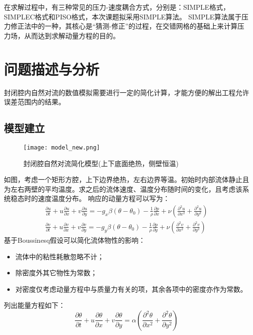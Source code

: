 \documentclass[UTF8]{article} %
\begin{document}
在求解过程中，有三种常见的压力-速度耦合方式，分别是：SIMPLE格式，SIMPLEC格式和PISO格式，本次课题拟采用SIMPLE算法。
SIMPLE算法属于压力修正法中的一种，其核心是“猜测-修正”的过程，在交错网格的基础上来计算压力场，从而达到求解动量方程的目的。

\section{问题描述与分析}
封闭腔内自然对流的数值模拟需要进行一定的简化计算，才能方便的解出工程允许误差范围内的结果。

\subsection{模型建立}
\begin{figure}[h]
  \centering
  \texttt{[image: model\_new.png]}
  \caption{封闭腔自然对流简化模型(上下底面绝热，侧壁恒温)}
  \label{fig:model}
\end{figure}
如图，考虑一个矩形方腔，上下边界绝热，左右边界等温。初始时内部流体静止且为左右两壁的平均温度。求之后的流体速度、温度分布随时间的变化，且考虑该系统稳态时的速度温度分布。
响应的动量方程可以写为：
\begin{gather}
  \frac{\partial u}{\partial t} + u \frac{\partial u}{\partial x} + v \frac{\partial u}{\partial y} = -g_x \beta (\theta-\theta_0) - \frac{1}{\rho} \frac{\partial p}{\partial x}+\nu(\frac{\partial^2 u}{\partial x^2}+\frac{\partial^2 u}{\partial y^2}) \\
  \frac{\partial v}{\partial t} + u \frac{\partial v}{\partial x} + v \frac{\partial v}{\partial y} = -g_y \beta (\theta-\theta_0) - \frac{1}{\rho} \frac{\partial p}{\partial y}+\nu(\frac{\partial^2 v}{\partial x^2}+\frac{\partial^2 v}{\partial y^2})
\end{gather}
基于Boussinesq假设可以简化流体物性的影响：
\begin{itemize}
  \item 流体中的粘性耗散忽略不计；
  \item 除密度外其它物性为常数；
  \item 对密度仅考虑动量方程中与质量力有关的项，其余各项中的密度亦作为常数。
\end{itemize}
列出能量方程如下：
\begin{equation}
  \frac{\partial \theta}{\partial t} + u \frac{\partial \theta}{\partial x} + v \frac{\partial \theta}{\partial y} = \alpha(\frac{\partial^2 \theta}{\partial x^2}+\frac{\partial^2 \theta}{\partial y^2})
\end{equation}
\end{document}
